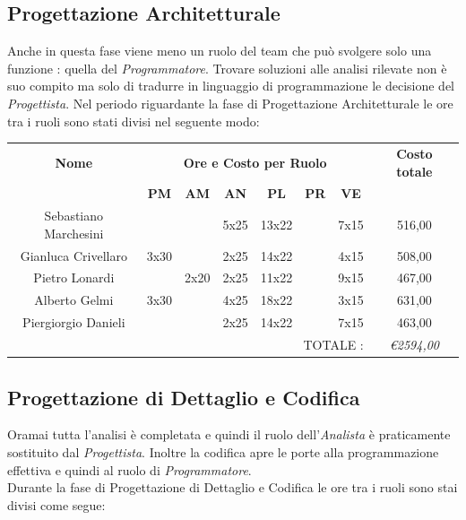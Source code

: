 \documentclass[12pt,a4paper,titlepage]{article}
\begin{document}
	\subsection{Progettazione Architetturale}
	Anche in questa fase viene meno un ruolo del team che può svolgere solo una funzione : quella del \textit{Programmatore}. Trovare soluzioni alle analisi rilevate non è suo compito ma solo di tradurre in linguaggio di programmazione le decisione del \textit{Progettista}.
	Nel periodo riguardante la fase di Progettazione Architetturale le ore tra i ruoli sono stati divisi nel seguente modo:\\
	
	{\renewcommand\arraystretch{1.2}  %
		\begin{tabular}{|c|c|c|c|c|c|c|c|}
			\hline 
			\textbf{Nome} & \multicolumn{6}{c|}{\textbf{Ore e Costo per Ruolo}} & \textbf{Costo totale} \\ 
			& \textbf{PM} & \textbf{AM} & \textbf{AN} & \textbf{PL} & \textbf{PR} & \textbf{VE} & \textbf{  } \\ 
			\hline 
			Sebastiano Marchesini &  &  & 5x25 & 13x22 &  & 7x15 & 516,00 \\ 
			\hline 
			Gianluca Crivellaro & 3x30 &  & 2x25 & 14x22 &  & 4x15 & 508,00 \\ 
			\hline 
			Pietro Lonardi &  & 2x20 & 2x25 & 11x22 &  & 9x15 & 467,00 \\ 
			\hline 
			Alberto Gelmi & 3x30 &  & 4x25 & 18x22 &  & 3x15 & 631,00 \\ 
			\hline 
			Piergiorgio Danieli &  &  & 2x25 & 14x22 &  & 7x15 & 463,00 \\ 
			\hline 
			\multicolumn{7}{r|}{TOTALE  :} & \textit{\euro 2594,00} \\ 
	\end{tabular}} 
	
	\subsection{Progettazione di Dettaglio e Codifica}
	Oramai tutta l'analisi è completata e quindi il ruolo dell'\textit{Analista} è praticamente sostituito dal \textit{Progettista}. Inoltre la codifica apre le porte alla programmazione effettiva e quindi al ruolo di \textit{Programmatore}.\\
	Durante la fase di Progettazione di Dettaglio e Codifica le ore tra i ruoli sono stai divisi come segue:
	\\
	
\end{document}
